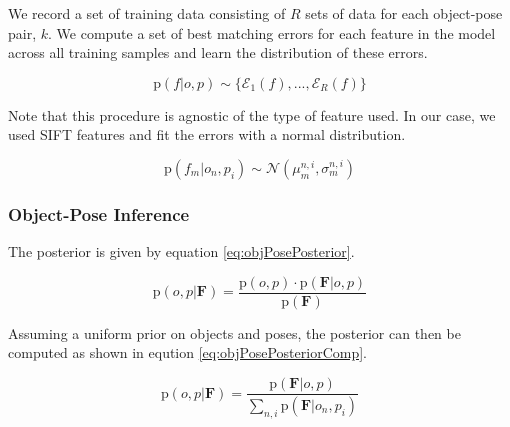 \documentclass[conference]{IEEEtran}
\newcommand{\prob}[1]{\text{p}(#1)} %
\newcommand{\set}[1]{\mathbf{#1}} %
\newcommand{\cursive}[1]{\mathcal{#1}}
\begin{document}
        We record a set of training data consisting of $R$ sets of data for each object-pose pair, $k$. We compute a set of best matching errors for each feature in the model across all training samples and learn the distribution of these errors.

        \begin{equation}
            \prob{f|o,p} \sim \{\cursive{E}_1(f), ...,  \cursive{E}_R(f)\}
        \end{equation}

        Note that this procedure is agnostic of the type of feature used. In our case, we used SIFT features and fit the errors with a normal distribution. 

        \begin{equation}
            \prob{f_m|o_n,p_i} \sim \cursive{N}(\mu_{m}^{n,i},\sigma_{m}^{n,i})
        \end{equation}

    \subsubsection{Object-Pose Inference}

        The posterior is given by equation \ref{eq:objPosePosterior}.

        \begin{equation}
            \label{eq:objPosePosterior}
            \prob{o,p|\set{F}} = \frac{\prob{o,p} \cdot \prob{\set{F}|o,p}}{\prob{\set{F}}}
        \end{equation}



        Assuming a uniform prior on objects and poses, the posterior can then be computed as shown in eqution \ref{eq:objPosePosteriorComp}.

        \begin{equation}
            \label{eq:objPosePosteriorComp}
            \prob{o,p|\set{F}} = \frac{\prob{\set{F}|o,p}}{\sum_{n,i} \prob{\set{F}|o_n,p_i}}
        \end{equation}
        
\end{document}
